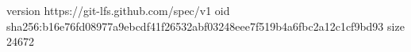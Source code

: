 version https://git-lfs.github.com/spec/v1
oid sha256:b16e76fd08977a9ebcdf41f26532abf03248eee7f519b4a6fbc2a12c1cf9bd93
size 24672
